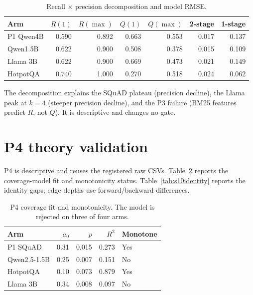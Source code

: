 \begin{table}[pos=htbp]
  \centering
  \caption{Recall $\times$ precision decomposition and model RMSE.}
  \label{tab:s9brq}
  \footnotesize
  \begin{tabular}{@{}lrrrrrr@{}}
    \toprule
    Arm & $R(1)$ & $R(\max)$ & $Q(1)$ & $Q(\max)$ & 2-stage & 1-stage \\
    \midrule
    P1 Qwen4B & 0.590 & 0.892 & 0.663 & 0.553 & 0.017 & 0.137 \\
    Qwen1.5B & 0.622 & 0.900 & 0.508 & 0.378 & 0.015 & 0.109 \\
    Llama 3B & 0.622 & 0.900 & 0.669 & 0.473 & 0.021 & 0.149 \\
    HotpotQA & 0.740 & 1.000 & 0.270 & 0.518 & 0.024 & 0.062 \\
    \bottomrule
  \end{tabular}
\end{table}

The decomposition explains the SQuAD plateau (precision decline), the Llama peak
at $k=4$ (steeper precision decline), and the P3 failure (BM25 features predict
$R$, not $Q$). It is descriptive and changes no gate.

\section{P4 theory validation}\label{sec:s10}

P4 is descriptive and reuses the registered raw CSVs. Table~\ref{tab:s10coverage}
reports the coverage-model fit and monotonicity status. Table~\ref{tab:s10identity}
reports the identity gaps; edge depths use forward/backward differences.

\begin{table}[pos=htbp]
  \centering
  \caption{P4 coverage fit and monotonicity. The model is rejected on three of
  four arms.}
  \label{tab:s10coverage}
  \footnotesize
  \begin{tabular}{@{}lrrrl@{}}
    \toprule
    \textbf{Arm} & $a_0$ & $p$ & $R^2$ & \textbf{Monotone} \\
    \midrule
    P1 SQuAD & 0.31 & 0.015 & 0.273 & Yes \\
    Qwen2.5-1.5B & 0.25 & 0.007 & 0.151 & No \\
    HotpotQA & 0.10 & 0.073 & 0.879 & Yes \\
    Llama 3B & 0.34 & 0.008 & 0.097 & No \\
    \bottomrule
  \end{tabular}
\end{table}

